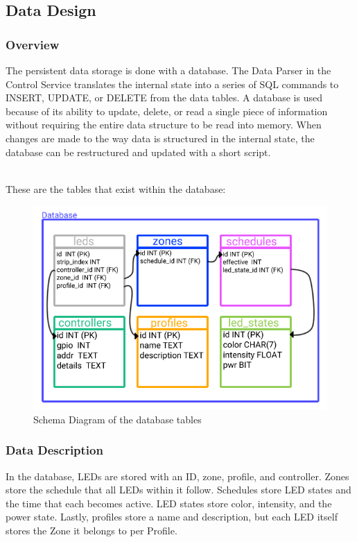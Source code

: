 \documentclass[onecolumn, draftclsnofoot,10pt, compsoc]{IEEEtran}
\begin{document}
		\subsection{Data Design}
			\subsubsection{Overview}
			The persistent data storage is done with a database.
			The Data Parser in the Control Service translates the internal state into a series of SQL commands to INSERT, UPDATE, or DELETE from the data tables.
			A database is used because of its ability to update, delete, or read a single piece of information without requiring the entire data structure to be read into memory.
			When changes are made to the way data is structured in the internal state, the database can be restructured and updated with a short script.

			\noindent \\These are the tables that exist within the database:
			\begin{center}
				\begin{figure}[H]
					\includegraphics[width=\linewidth]{systemDiagrams/database.png}
					\caption{Schema Diagram of the database tables}
					\label{fig:databaseDiagram}
				\end{figure}
			\end{center}

			\subsubsection{Data Description}
			In the database, LEDs are stored with an ID, zone, profile, and controller. Zones store the schedule that all LEDs within it follow.
			Schedules store LED states and the time that each becomes active. LED states store color, intensity, and the power state.
			Lastly, profiles store a name and description, but each LED itself stores the Zone it belongs to per Profile.
\end{document}
